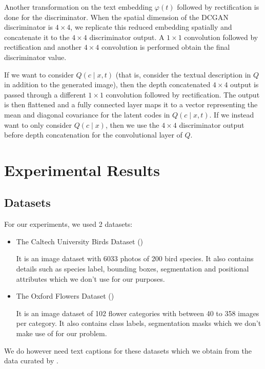 \documentclass{article}
\begin{document}
Another transformation on the text embedding $\varphi(t)$ followed by rectification is done for the discriminator. When the spatial dimension of the DCGAN discriminator is $4\times 4$, we replicate this reduced embedding spatially and concatenate it to the $4\times 4$ discriminator output. A $1\times 1$ convolution followed by rectification and another $4\times 4$ convolution is performed obtain the final discriminator value.

If we want to consider $Q(c\mid x,t)$ (that is, consider the textual description in $Q$ in addition to the generated image), then the depth concatenated $4\times 4$ output is passed through a different $1\times 1$ convolution followed by rectification. The output is then flattened and a fully connected layer maps it to a vector representing the mean and diagonal covariance for the latent codes in $Q(c\mid x,t)$. If we instead want to only consider $Q(c\mid x)$, then we use the $4\times 4$ discriminator output before depth concatenation for the convolutional layer of $Q$.




\section{Experimental Results}
\subsection{Datasets}
For our experiments, we used 2 datasets: 
\begin{itemize}
    \item The Caltech University Birds Dataset (\cite{cub})

         It is an image
        dataset with 6033 photos of 200 bird species. It also contains details
        such as species label, bounding boxes, segmentation and positional
        attributes which we don't use for our purposes.
    \item The Oxford Flowers Dataset (\cite{flowers})
    
       It is an image dataset of
        102 flower categories with between 40 to 358 images per category. It
        also contains class labels, segmentation masks which we don't make use
        of for our problem.
\end{itemize}
We do however need text captions for these datasets which we obtain from the data
curated by \cite{visualdesc}.
\end{document}
